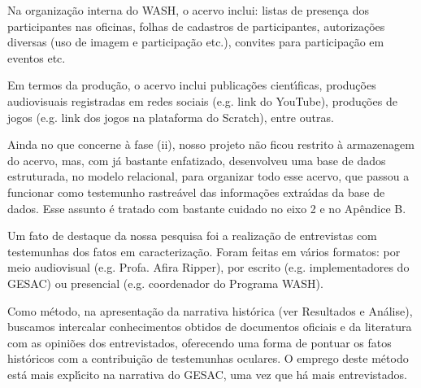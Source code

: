 \documentclass[
12pt,		%
openright,	%
twoside,  %
a4paper,			%
chapter=TITLE,		%
english,			%
french,				%
spanish,			%
brazil				%
]{USPSC-classe/USPSC}
\begin{document}
Na organiza\c{c}\~ao interna do WASH, o acervo inclui: listas de presen\c{c}a dos participantes nas oficinas, folhas de cadastros de participantes, autoriza\c{c}\~oes diversas (uso de imagem e participa\c{c}\~ao etc.), convites   para participa\c{c}\~ao em eventos etc.









Em termos da produ\c{c}\~ao, o acervo inclui publica\c{c}\~oes cient\'{\i}ficas, produ\c{c}\~oes audiovisuais registradas em redes sociais (e.g. link do YouTube), produ\c{c}\~oes de jogos (e.g. link dos jogos na plataforma do Scratch), entre outras.









Ainda no que concerne \`a fase (ii), nosso projeto n\~ao ficou restrito \`a armazenagem do acervo, mas, com j\'a bastante enfatizado, desenvolveu uma base de dados estruturada, no modelo relacional, para organizar todo esse acervo, que passou a funcionar como testemunho rastre\'avel das informa\c{c}\~oes extra\'{\i}das da base de dados. Esse assunto \'e tratado com bastante cuidado no eixo 2 e no Ap\^endice B.









Um fato de destaque da nossa pesquisa foi a realiza\c{c}\~ao de entrevistas com testemunhas dos fatos em caracteriza\c{c}\~ao. Foram feitas em v\'arios formatos: por meio audiovisual (e.g. Profa. Afira Ripper), por escrito (e.g. implementadores do GESAC) ou presencial (e.g. coordenador do Programa WASH).









Como m\'etodo, na apresenta\c{c}\~ao da narrativa hist\'orica (ver Resultados e An\'alise), buscamos intercalar conhecimentos obtidos de documentos oficiais e da literatura com as opini\~oes dos entrevistados, oferecendo uma forma de pontuar os fatos hist\'oricos com a contribui\c{c}\~ao de testemunhas oculares. O emprego deste m\'etodo est\'a mais expl\'{\i}cito na narrativa do GESAC, uma vez que h\'a mais entrevistados.
\end{document}

